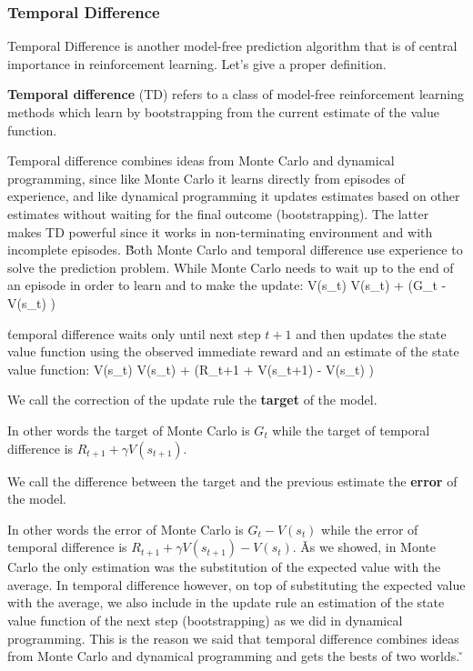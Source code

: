 \subsubsection{Temporal Difference}

Temporal Difference is another model-free prediction algorithm that is of central importance in reinforcement
learning. Let's give a proper definition.

\textbf{Temporal difference} (TD) refers to a class of model-free reinforcement learning methods which learn by
bootstrapping from the current estimate of the value function.
\ed

Temporal difference combines ideas from Monte Carlo and dynamical programming, since like Monte Carlo it learns
directly from episodes of experience, and like dynamical programming it updates estimates based on other estimates
without waiting for the final outcome (bootstrapping). The latter makes TD powerful since it works in non-terminating
environment and with incomplete episodes. \v

Both Monte Carlo and temporal difference use experience to solve the prediction problem. While Monte Carlo needs to
wait up to the end of an episode in order to learn and to make the update:
\bse
V(s_t) \gets V(s_t) + \alpha \left(G_t - V(s_t) \right)
\ese

\v

temporal difference waits only until next step $t+1$ and then updates the state value function using the observed
immediate reward and an estimate of the state value function:
\bse
V(s_t) \gets V(s_t) + \alpha \left(R_{t+1} + \gamma V(s_{t+1}) - V(s_t) \right)
\ese

\bd[Target]
We call the correction of the update rule the \textbf{target} of the model.
\ed

In other words the target of Monte Carlo is $G_t$ while the target of temporal difference is $R_{t+1} + \gamma V
(s_{t+1})$.

\bd[Error]
We call the difference between the target and the previous estimate the \textbf{error} of the model.
\ed

In other words the error of Monte Carlo is $G_t - V(s_t)$ while the error of temporal difference is $R_{t+1} + \gamma
V(s_{t+1}) - V(s_t)$. \v

As we showed, in Monte Carlo the only estimation was the substitution of the expected value with the average. In
temporal difference however, on top of substituting the expected value with the average, we also include in the
update rule an estimation of the state value function of the next step (bootstrapping) as we did in dynamical
programming. This is the reason we said that temporal difference combines ideas from Monte Carlo and dynamical
programming and gets the bests of two worlds. \v

